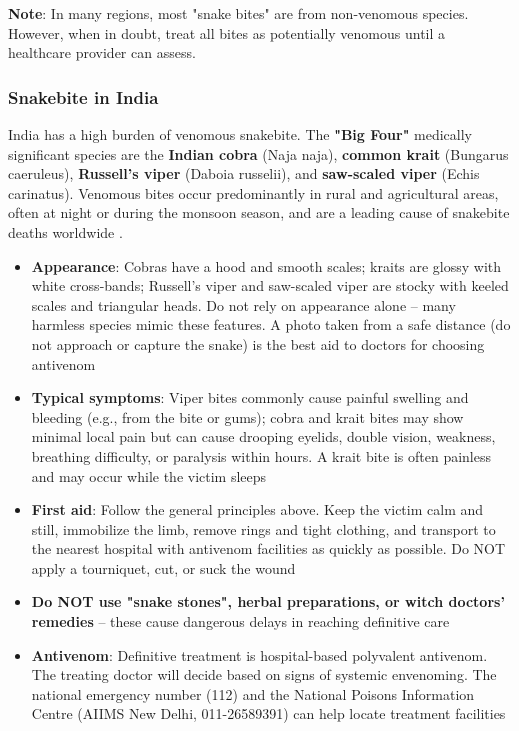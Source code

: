 \noindent\textbf{Note}: In many regions, most "snake bites" are from non-venomous species. However, when in doubt, treat all bites as potentially venomous until a healthcare provider can assess.

\subsubsection{Snakebite in India}

India has a high burden of venomous snakebite. The \textbf{"Big Four"} medically significant species are the \textbf{Indian cobra} (Naja naja), \textbf{common krait} (Bungarus caeruleus), \textbf{Russell's viper} (Daboia russelii), and \textbf{saw-scaled viper} (Echis carinatus). Venomous bites occur predominantly in rural and agricultural areas, often at night or during the monsoon season, and are a leading cause of snakebite deaths worldwide \cite{mohfw_snakebite}.

\begin{itemize}[leftmargin=*]
  \item \textbf{Appearance}: Cobras have a hood and smooth scales; kraits are glossy with white cross-bands; Russell's viper and saw-scaled viper are stocky with keeled scales and triangular heads. Do not rely on appearance alone -- many harmless species mimic these features. A photo taken from a safe distance (do not approach or capture the snake) is the best aid to doctors for choosing antivenom
  \item \textbf{Typical symptoms}: Viper bites commonly cause painful swelling and bleeding (e.g., from the bite or gums); cobra and krait bites may show minimal local pain but can cause drooping eyelids, double vision, weakness, breathing difficulty, or paralysis within hours. A krait bite is often painless and may occur while the victim sleeps
  \item \textbf{First aid}: Follow the general principles above. Keep the victim calm and still, immobilize the limb, remove rings and tight clothing, and transport to the nearest hospital with antivenom facilities as quickly as possible. Do NOT apply a tourniquet, cut, or suck the wound
  \item \textbf{Do NOT use "snake stones", herbal preparations, or witch doctors' remedies} -- these cause dangerous delays in reaching definitive care
  \item \textbf{Antivenom}: Definitive treatment is hospital-based polyvalent antivenom. The treating doctor will decide based on signs of systemic envenoming. The national emergency number (112) and the National Poisons Information Centre (AIIMS New Delhi, 011-26589391) can help locate treatment facilities \cite{npic}
\end{itemize}

